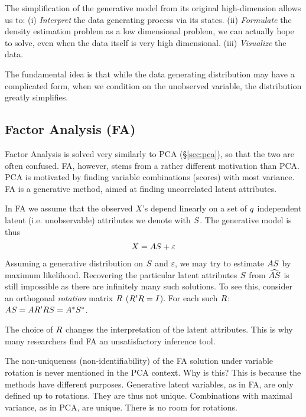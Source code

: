The simplification of the generative model from its original high-dimension allows us to:
(i) \emph{Interpret} the data generating process via its states. 
(ii) \emph{Formulate} the density estimation problem as a low dimensional problem, we can actually hope to solve, even when the data itself is very high dimensional.
(iii) \emph{Visualize} the data. 

The fundamental idea is that while the data generating distribution may have a complicated form, when we condition on the unobserved variable, the distribution greatly simplifies. 



\subsection{Factor Analysis (FA)}
\label{sec:factor_analysis}

Factor Analysis is solved very similarly to PCA (\S\ref{sec:pca}), so that the two are often confused. 
FA, however, stems from a rather different motivation than PCA.
PCA is motivated by finding variable combinations (scores) with most variance. 
FA is a generative method, aimed at finding uncorrelated latent attributes. 

In FA we assume that the observed $X$'s depend linearly on a set of $q$ independent latent (i.e. unobservable) attributes we denote with $S$.
The generative model is thus
\begin{align}
\label{eq:factor}
	X=A S+\varepsilon
\end{align}
Assuming a generative distribution on $S$ and $\varepsilon$, we may try to estimate $A S$ by maximum likelihood.
Recovering the particular latent attributes $S$ from $\widehat{AS}$ is still impossible as there are infinitely many such solutions. To see this, consider an orthogonal \emph{rotation} matrix $R$ ($R' R=I$). For each such $R$: $ A S=A R' R S = A^* S^*$.

The choice of $R$ changes the interpretation of the latent attributes. This is why many researchers find FA an unsatisfactory inference tool.

\begin{remark}
	The non-uniqueness (non-identifiability) of the FA solution under variable rotation is never mentioned in the PCA context. Why is this?
	This is because the methods have different purposes. 
	Generative latent variables, as in FA, are only defined up to rotations. They are thus not unique. 
	Combinations with maximal variance, as in PCA, are unique. There is no room for rotations.
\end{remark}



